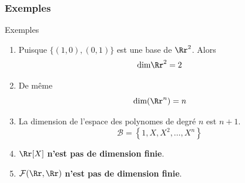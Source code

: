 \documentclass[dvipsnames]{beamer}
\begin{document}
\begin{frame}[t]
  \frametitle{Exemples}
 \begin{block}{Exemples}
   \small
   \begin{enumerate}
     \item Puisque $\{(1,0), (0,1)\}$ est une base de $\Rr^2$. Alors 
       \begin{equation*}
         \text{dim}\Rr^2 = 2
       \end{equation*}
      \item De même 
        \begin{equation*}
          \text{dim}(\Rr^n) = n
        \end{equation*}
      \item La dimension de l'espace des polynomes de degré $n$ est
        \alert{$n+1$}.
        \begin{equation*}
          \mathcal{B} = \left\{ 1, X, X^2, \ldots, X^n\right\}
        \end{equation*}
      \item $\Rr[X]$ \textbf{n'est pas de dimension finie}.\\[4pt]
      \item $\mathcal{F}(\Rr, \Rr)$ \textbf{n'est pas de dimension finie}.\\[4pt]
   \end{enumerate}
 \end{block} 
\end{frame}
\end{document}
